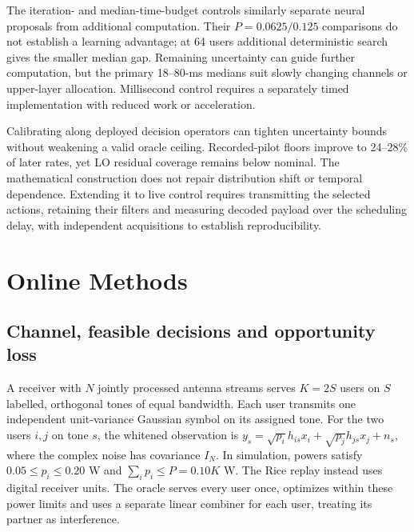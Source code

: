 \documentclass[lineno,pdflatex,sn-nature]{sn-jnl}
\begin{document}
The iteration- and median-time-budget controls similarly separate neural proposals from additional computation. Their \(P=0.0625/0.125\) comparisons do not establish a learning advantage; at 64 users additional deterministic search gives the smaller median gap. Remaining uncertainty can guide further computation, but the primary 18--80-ms medians suit slowly changing channels or upper-layer allocation. Millisecond control requires a separately timed implementation with reduced work or acceleration.

Calibrating along deployed decision operators can tighten uncertainty bounds without weakening a valid oracle ceiling. Recorded-pilot floors improve to 24--28\% of later rates, yet LO residual coverage remains below nominal. The mathematical construction does not repair distribution shift or temporal dependence. Extending it to live control requires transmitting the selected actions, retaining their filters and measuring decoded payload over the scheduling delay, with independent acquisitions to establish reproducibility.
\section*{Online Methods}
\subsection*{Channel, feasible decisions and opportunity loss}
A receiver with \(N\) jointly processed antenna streams serves \(K=2S\) users on \(S\) labelled, orthogonal tones of equal bandwidth. Each user transmits one independent unit-variance Gaussian symbol on its assigned tone. For the two users \(i,j\) on tone \(s\), the whitened observation is \(y_s=\sqrt{p_i}h_{is}x_i+\sqrt{p_j}h_{js}x_j+n_s\), where the complex noise has covariance \(I_N\). In simulation, powers satisfy \(0.05\leq p_i\leq0.20\) W and \(\sum_i p_i\leq P=0.10K\) W. The Rice replay instead uses digital receiver units. The oracle serves every user once, optimizes within these power limits and uses a separate linear combiner for each user, treating its partner as interference.
\end{document}

